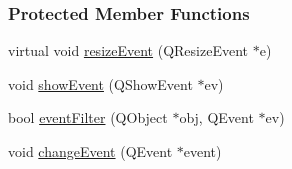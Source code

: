 \subsubsection*{Protected Member Functions}
\begin{DoxyCompactItemize}
\item 
virtual void \mbox{\hyperlink{classMainWindow_af925e4c05190e6672fbc4a171b0016b8}{resize\+Event}} (Q\+Resize\+Event $\ast$e)
\item 
void \mbox{\hyperlink{classMainWindow_a332a98884795104796ad57e49943134c}{show\+Event}} (Q\+Show\+Event $\ast$ev)
\item 
bool \mbox{\hyperlink{classMainWindow_a53b218282f3d113b2aec441a3313f472}{event\+Filter}} (Q\+Object $\ast$obj, Q\+Event $\ast$ev)
\item 
void \mbox{\hyperlink{classMainWindow_ac7c881667b4ba4986b5a0030452ee3f0}{change\+Event}} (Q\+Event $\ast$event)
\end{DoxyCompactItemize}
